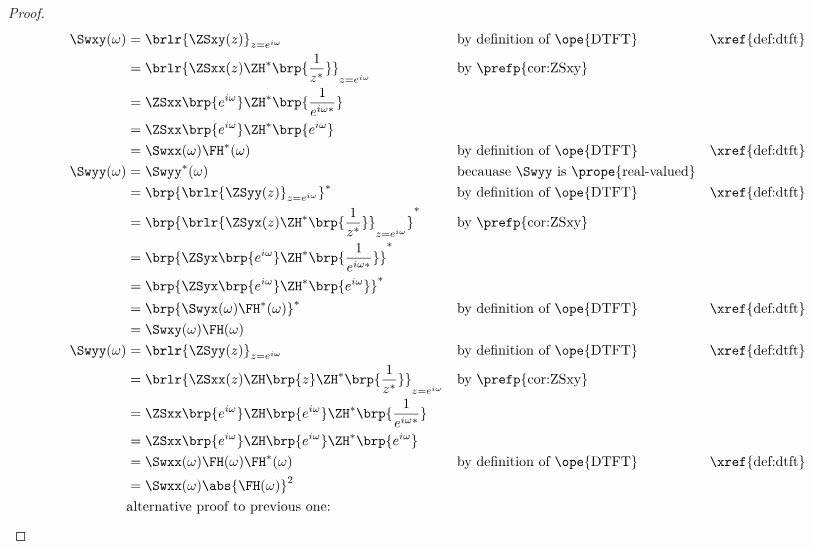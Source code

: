 \begin{proof}
\begin{align*}
   \Swxy(\omega)
     &= \brlr{\ZSxy(z)}_{z=e^{i\omega}}
     && \text{by definition of \ope{DTFT}}
     && \text{\xref{def:dtft}}
   \\&= \brlr{\ZSxx(z)\ZH^\ast\brp{\frac{1}{z^\ast}}}_{z=e^{i\omega}}
     && \text{by \prefp{cor:ZSxy}}
   \\&= \ZSxx\brp{e^{i\omega}}\ZH^\ast\brp{\frac{1}{e^{i\omega\ast}}}
   \\&= \ZSxx\brp{e^{i\omega}}\ZH^\ast\brp{e^{i\omega}}
   \\&= \Swxx(\omega) \FH^\ast(\omega)
     && \text{by definition of \ope{DTFT}}
     && \text{\xref{def:dtft}}
   \\
   \Swyy(\omega)
     &= \Swyy^\ast(\omega)
     && \text{becauase $\Swyy$ is \prope{real-valued}}
   \\&= \brp{\brlr{\ZSyy(z)}_{z=e^{i\omega}}}^\ast
     && \text{by definition of \ope{DTFT}}
     && \text{\xref{def:dtft}}
   \\&= \brp{\brlr{\ZSyx(z)\ZH^\ast\brp{\frac{1}{z^\ast}}}_{z=e^{i\omega}}}^\ast
     && \text{by \prefp{cor:ZSxy}}
   \\&= \brp{\ZSyx\brp{e^{i\omega}} \ZH^\ast\brp{\frac{1}{e^{i\omega\ast}}}}^\ast
   \\&= \brp{\ZSyx\brp{e^{i\omega}} \ZH^\ast\brp{e^{i\omega}}}^\ast
   \\&= \brp{\Swyx(\omega) \FH^\ast(\omega)}^\ast
     && \text{by definition of \ope{DTFT}}
     && \text{\xref{def:dtft}}
   \\&= \Swxy(\omega) \FH(\omega)
   \\
   \Swyy(\omega)
     &= \brlr{\ZSyy(z)}_{z=e^{i\omega}}
     && \text{by definition of \ope{DTFT}}
     && \text{\xref{def:dtft}}
   \\&= \brlr{\ZSxx(z)\ZH\brp{z} \ZH^\ast\brp{\frac{1}{z^\ast}}}_{z=e^{i\omega}}
     && \text{by \prefp{cor:ZSxy}}
   \\&= \ZSxx\brp{e^{i\omega}} \ZH\brp{e^{i\omega}} \ZH^\ast\brp{\frac{1}{e^{i\omega\ast}}}
   \\&= \ZSxx\brp{e^{i\omega}} \ZH\brp{e^{i\omega}} \ZH^\ast\brp{e^{i\omega}}
   \\&= \Swxx(\omega) \FH(\omega) \FH^\ast(\omega)
     && \text{by definition of \ope{DTFT}}
     && \text{\xref{def:dtft}}
   \\&= \Swxx(\omega) \abs{\FH(\omega)}^2
   \\
     &\text{alternative proof to previous one:}

\end{align*}
\end{proof}
